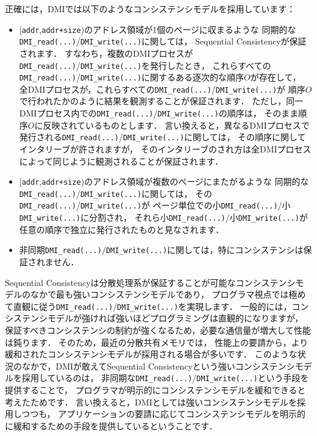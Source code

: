 \documentclass[report,12pt]{jsbook}
\begin{document}
正確には，DMIでは以下のようなコンシステンシモデルを採用しています：
\begin{itemize}
\item $[$\texttt{addr},\texttt{addr+size})のアドレス領域が1個のページに収まるような
  同期的な\texttt{DMI\_read(...)}/\texttt{DMI\_write(...)}に関しては，
  Sequential Consistencyが保証されます．
  すなわち，複数のDMIプロセスが\texttt{DMI\_read(...)}/\texttt{DMI\_write(...)}を発行したとき，
  これらすべての\texttt{DMI\_read(...)}/\texttt{DMI\_write(...)}に関するある逐次的な順序$O$が存在して，
  全DMIプロセスが，これらすべての\texttt{DMI\_read(...)}/\texttt{DMI\_write(...)}が
  順序$O$で行われたかのように結果を観測することが保証されます．
  ただし，同一DMIプロセス内での\texttt{DMI\_read(...)}/\texttt{DMI\_write(...)}の順序は，
  そのまま順序$O$に反映されているものとします．
  言い換えると，異なるDMIプロセスで発行される\texttt{DMI\_read(...)}/\texttt{DMI\_write(...)}に関しては，
  その順序に関してインタリーブが許されますが，
  そのインタリーブのされ方は全DMIプロセスによって同じように観測されることが保証されます．
\item $[$\texttt{addr},\texttt{addr+size})のアドレス領域が複数のページにまたがるような
  同期的な\texttt{DMI\_read(...)}/\texttt{DMI\_write(...)}に関しては，
  その\texttt{DMI\_read(...)}/\texttt{DMI\_write(...)}が
  ページ単位での小\texttt{DMI\_read(...)}/小\texttt{DMI\_write(...)}に分割され，
  それら小\texttt{DMI\_read(...)}/小\texttt{DMI\_write(...)}が任意の順序で独立に発行されたものと見なされます．
\item 非同期\texttt{DMI\_read(...)}/\texttt{DMI\_write(...)}に関しては，特にコンシステンシは保証されません．
\end{itemize}

Sequential Consistencyは分散処理系が保証することが可能なコンシステンシモデルのなかで最も強いコンシステンシモデルであり，
プログラマ視点では極めて直観に従う\texttt{DMI\_read(...)}/\texttt{DMI\_write(...)}を実現します．
一般的には，コンシステンシモデルが強ければ強いほどプログラミングは直観的になりますが，
保証すべきコンシステンシの制約が強くなるため，必要な通信量が増大して性能は鈍ります．
そのため，最近の分散共有メモリでは，
性能上の要請から，より緩和されたコンシステンシモデルが採用される場合が多いです．
このような状況のなかで，DMIが敢えてSequential Consistencyという強いコンシステンシモデルを採用しているのは，
非同期な\texttt{DMI\_read(...)}/\texttt{DMI\_write(...)}という手段を提供することで，
プログラマが明示的にコンシステンシモデルを緩和できると考えたためです．
言い換えると，DMIとしては強いコンシステンシモデルを採用しつつも，
アプリケーションの要請に応じてコンシステンシモデルを明示的に緩和するための手段を提供しているということです．
\end{document}

